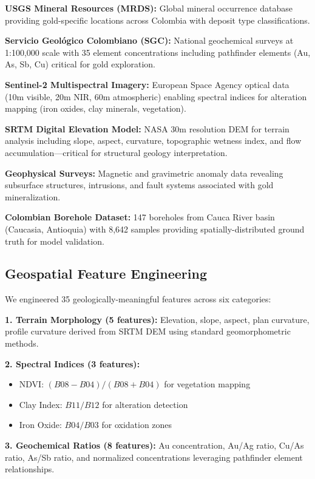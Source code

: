\documentclass[12pt,a4paper]{article}
\begin{document}
\textbf{USGS Mineral Resources (MRDS):} Global mineral occurrence database providing gold-specific locations across Colombia with deposit type classifications.

\textbf{Servicio Geológico Colombiano (SGC):} National geochemical surveys at 1:100,000 scale with 35 element concentrations including pathfinder elements (Au, As, Sb, Cu) critical for gold exploration.

\textbf{Sentinel-2 Multispectral Imagery:} European Space Agency optical data (10m visible, 20m NIR, 60m atmospheric) enabling spectral indices for alteration mapping (iron oxides, clay minerals, vegetation).

\textbf{SRTM Digital Elevation Model:} NASA 30m resolution DEM for terrain analysis including slope, aspect, curvature, topographic wetness index, and flow accumulation—critical for structural geology interpretation.

\textbf{Geophysical Surveys:} Magnetic and gravimetric anomaly data revealing subsurface structures, intrusions, and fault systems associated with gold mineralization.

\textbf{Colombian Borehole Dataset:} 147 boreholes from Cauca River basin (Caucasia, Antioquia) with 8,642 samples providing spatially-distributed ground truth for model validation.

\subsection{Geospatial Feature Engineering}

We engineered 35 geologically-meaningful features across six categories:

\textbf{1. Terrain Morphology (5 features):} Elevation, slope, aspect, plan curvature, profile curvature derived from SRTM DEM using standard geomorphometric methods.

\textbf{2. Spectral Indices (3 features):}
\begin{itemize}
    \item NDVI: $(B08 - B04)/(B08 + B04)$ for vegetation mapping
    \item Clay Index: $B11/B12$ for alteration detection
    \item Iron Oxide: $B04/B03$ for oxidation zones
\end{itemize}

\textbf{3. Geochemical Ratios (8 features):} Au concentration, Au/Ag ratio, Cu/As ratio, As/Sb ratio, and normalized concentrations leveraging pathfinder element relationships.
\end{document}
